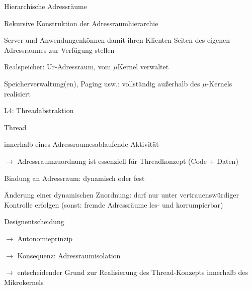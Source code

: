 \documentclass[a4paper]{article}
\begin{document}
\begin{multicols}{3}
    Hierarchische Adressräume

    \begin{itemize*}
        \item
        Rekursive Konstruktion der Adressraumhierarchie
        \begin{itemize*}
            \item Server und Anwendungenkönnen damit ihren Klienten Seiten des eigenen Adressraumes zur Verfügung stellen
            \item Realspeicher: Ur-Adressraum, vom $\mu$Kernel verwaltet
            \item Speicherverwaltung(en), Paging usw.: vollständig außerhalb des $\mu$-Kernels realisiert
        \end{itemize*}
    \end{itemize*}

    L4: Threadabstraktion

    \begin{itemize*}
        \item
        Thread
        \begin{itemize*}
            \item innerhalb eines Adressraumesablaufende Aktivität
            \item $\rightarrow$  Adressraumzuordnung ist essenziell für Threadkonzept (Code + Daten) \begin{itemize*} \item   Bindung an Adressraum: dynamisch oder fest \item   Änderung einer dynamischen Zuordnung: darf nur unter   vertrauenswürdiger Kontrolle erfolgen (sonst: fremde Adressräume   les- und korrumpierbar) \end{itemize*}
        \end{itemize*}
        \item
        Designentscheidung
        \begin{itemize*}
            \item $\rightarrow$  Autonomieprinzip
            \item $\rightarrow$  Konsequenz: Adressraumisolation
            \item $\rightarrow$  entscheidender Grund zur Realisierung des Thread-Konzepts innerhalb des Mikrokernels
        \end{itemize*}
    \end{itemize*}


\end{multicols}
\end{document}
